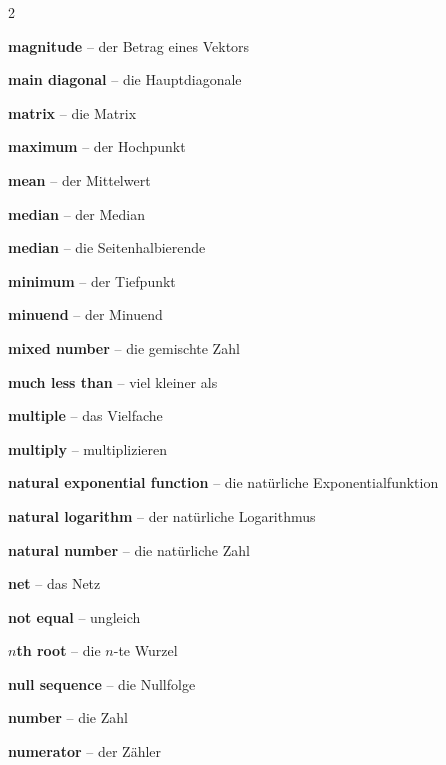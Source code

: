 \begin{multicols}{2}
\par\nopagebreak
\textbf{magnitude} -- der Betrag eines Vektors\dotfill\hyperref[e:305]{\pageref*{e:305}}\par
\textbf{main diagonal} -- die Hauptdiagonale\dotfill\hyperref[e:324]{\pageref*{e:324}}\par
\textbf{matrix} -- die Matrix\dotfill\hyperref[e:320]{\pageref*{e:320}}\par
\textbf{maximum} -- der Hochpunkt\dotfill\hyperref[e:282]{\pageref*{e:282}}\par
\textbf{mean} -- der Mittelwert\dotfill\hyperref[e:338]{\pageref*{e:338}}\par
\textbf{median} -- der Median\dotfill\hyperref[e:339]{\pageref*{e:339}}\par
\textbf{median} -- die Seitenhalbierende\dotfill\hyperref[e:192]{\pageref*{e:192}}\par
\textbf{minimum} -- der Tiefpunkt\dotfill\hyperref[e:283]{\pageref*{e:283}}\par
\textbf{minuend} -- der Minuend\dotfill\hyperref[e:19]{\pageref*{e:19}}\par
\textbf{mixed number} -- die gemischte Zahl\dotfill\hyperref[e:33]{\pageref*{e:33}}\par
\textbf{much less than} -- viel kleiner als\dotfill\hyperref[e:67]{\pageref*{e:67}}\par
\textbf{multiple} -- das Vielfache\dotfill\hyperref[e:55]{\pageref*{e:55}}\par
\textbf{multiply} -- multiplizieren\dotfill\hyperref[e:21]{\pageref*{e:21}}\par

\par\nopagebreak
\textbf{natural exponential function} -- die natürliche Exponentialfunktion\dotfill\hyperref[e:299]{\pageref*{e:299}}\par
\textbf{natural logarithm} -- der natürliche Logarithmus\dotfill\hyperref[e:300]{\pageref*{e:300}}\par
\textbf{natural number} -- die natürliche Zahl\dotfill\hyperref[e:5]{\pageref*{e:5}}\par
\textbf{net} -- das Netz\dotfill\hyperref[e:253]{\pageref*{e:253}}\par
\textbf{not equal} -- ungleich\dotfill\hyperref[e:61]{\pageref*{e:61}}\par
\textbf{$n$th root} -- die $n$-te Wurzel\dotfill\hyperref[e:47]{\pageref*{e:47}}\par
\textbf{null sequence} -- die Nullfolge\dotfill\hyperref[e:258]{\pageref*{e:258}}\par
\textbf{number} -- die Zahl\dotfill\hyperref[e:1]{\pageref*{e:1}}\par
\textbf{numerator} -- der Zähler\dotfill\hyperref[e:29]{\pageref*{e:29}}\par


\end{multicols}
